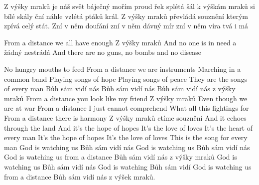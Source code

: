 Z výšky mraků je náš svět báječný
mořím proud řek splétá šál
k výškám mraků si bílé skály ční 
náhle vzlétá ptáků král.
Z výšky mraků převládá souznění
kterým zpívá celý stát.
Zní v něm doufání
zní v něm dávný mír
zní v něm víra tvá i má

From a distance we all have enough
Z výšky mraků
And no one is in need
a žádný nestrádá
And there are no guns, no bombs and no disease

No hungry mouths to feed
From a distance we are instruments
Marching in a common band
Playing songs of hope
Playing songs of peace
They are the songs of every man
Bůh sám vidí nás
Bůh sám vidí nás
Bůh sám vidí nás z výšky mraků
From a distance you look like my friend
Z výšky mraků
Even though we are at war
From a distance I just cannot comprehend
What all this fightings for
From a distance there is harmony
Z výšky mraků ctíme souznění
And it echoes through the land
And it's the hope of hopes
It's the love of loves
It's the heart of every man
It's the hope of hopes
It's the love of loves
This is the song for every man
God is watching us
Bůh sám vidí nás
God is watching us
Bůh sám vidí nás
God is watching us from a distance
Bůh sám vidí nás z výšky mraků
God is watching us
Bůh sám vidí nás
God is watching
Bůh sám vidí
God is watching us from a distance
Bůh sám vidí nás z výšek mraků.
